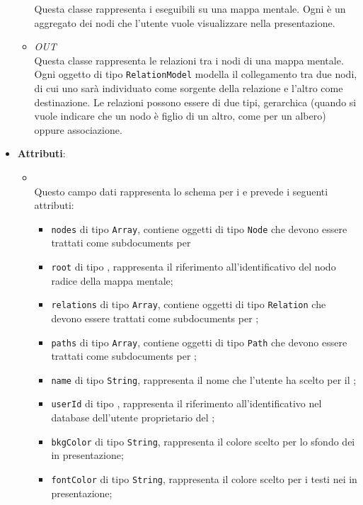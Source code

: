 \begin{itemize}
\begin{itemize}
Questa classe rappresenta i  eseguibili su una mappa mentale. Ogni  è un aggregato dei nodi che l’utente vuole visualizzare nella presentazione.
\item \textit{OUT} \hyperref[\nogloxy{Premi::Back-End::App::Models::RelationModel}]{}\\
Questa classe rappresenta le relazioni tra i nodi di una mappa mentale. Ogni oggetto di tipo \texttt{RelationModel} modella il collegamento tra due nodi, di cui uno sarà individuato come sorgente della relazione e l’altro come destinazione. Le relazioni possono essere di due tipi, gerarchica (quando si vuole indicare che un nodo è figlio di un altro, come per un albero) oppure associazione.
\end{itemize}
\item \textbf{Attributi}:
\begin{itemize}
\item {}
\\ Questo campo dati rappresenta lo schema  per i  e prevede i seguenti attributi:
\begin{itemize}
\item \texttt{nodes} di tipo \texttt{Array}, contiene oggetti di tipo \texttt{Node} che devono essere trattati come subdocuments per 
\item \texttt{root} di tipo \texttt{}, rappresenta il riferimento all'identificativo del nodo radice della mappa mentale;
\item \texttt{relations} di tipo \texttt{Array}, contiene oggetti di tipo \texttt{Relation} che devono essere trattati come subdocuments per ;
\item \texttt{paths} di tipo \texttt{Array}, contiene oggetti di tipo \texttt{Path} che devono essere trattati come subdocuments per ;
\item \texttt{name} di tipo \texttt{String}, rappresenta il nome che l’utente ha scelto per il ;
\item \texttt{userId} di tipo \texttt{}, rappresenta il riferimento all’identificativo nel database dell’utente proprietario del ;
\item \texttt{bkgColor} di tipo \texttt{String}, rappresenta il colore scelto per lo sfondo dei  in presentazione;
\item \texttt{fontColor} di tipo \texttt{String}, rappresenta il colore scelto per i testi nei  in presentazione;

\end{itemize}
\end{itemize}
\end{itemize}
